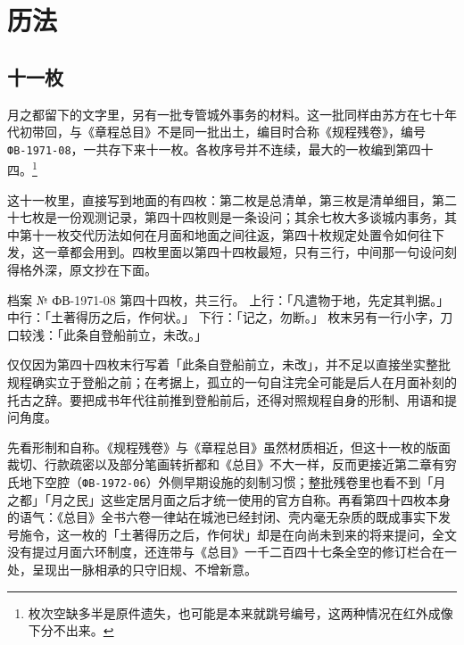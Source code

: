 \chapter{历法}


\section{十一枚}

月之都留下的文字里，另有一批专管城外事务的材料。这一批同样由苏方在七十年代初带回，与《章程总目》不是同一批出土，编目时合称《规程残卷》，编号 \mbox{\texttt{ФВ-1971-08}，}一共存下来十一枚。各枚序号并不连续，最大的一枚编到第四十四。\footnote{枚次空缺多半是原件遗失，也可能是本来就跳号编号，这两种情况在红外成像下分不出来。}

这十一枚里，直接写到地面的有四枚：第二枚是总清单，第三枚是清单细目，第二十七枚是一份观测记录，第四十四枚则是一条设问；其余七枚大多谈城内事务，其中第十一枚交代历法如何在月面和地面之间往返，第四十枚规定处置令如何往下发，这一章都会用到。四枚里面以第四十四枚最短，只有三行，中间那一句设问刻得格外深，原文抄在下面。

\begin{archive}[内部参考]{档案 № ФВ-1971-08}
第四十四枚，共三行。
上行：「凡遣物于地，先定其判据。」
中行：「土著得历之后，作何状。」
下行：「记之，勿断。」
枚末另有一行小字，刀口较浅：「此条自登船前立，未改。」
\end{archive}

仅仅因为第四十四枚末行写着「此条自登船前立，未改」，并不足以直接坐实整批规程确实立于登船之前；在考据上，孤立的一句自注完全可能是后人在月面补刻的托古之辞。要把成书年代往前推到登船前后，还得对照规程自身的形制、用语和提问角度。

先看形制和自称。《规程残卷》与《章程总目》虽然材质相近，但这十一枚的版面裁切、行款疏密以及部分笔画转折都和《总目》不大一样，反而更接近第二章有穷氏地下空腔（\texttt{ФВ-1972-06}）外侧早期设施的刻制习惯；整批残卷里也看不到「月之都」「月之民」这些定居月面之后才统一使用的官方自称。再看第四十四枚本身的语气：《总目》全书六卷一律站在城池已经封闭、壳内毫无杂质的既成事实下发号施令，这一枚的「土著得历之后，作何状」却是在向尚未到来的将来提问，全文没有提过月面六环制度，还连带与《总目》一千二百四十七条全空的修订栏合在一处，呈现出一脉相承的只守旧规、不增新意。

